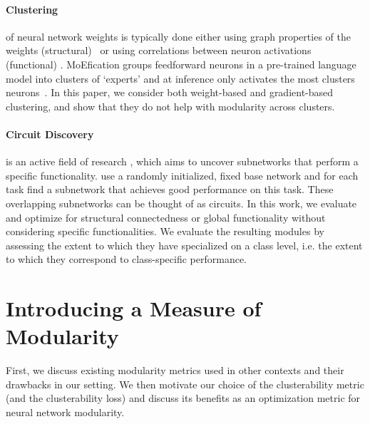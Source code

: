 \paragraph{Clustering} of neural network weights is typically done either using graph properties of the weights (structural)~\citep{watanabe2018modular, filan2021clusterability, patil2023neural} or using correlations between neuron activations (functional) \citep{hod2022detecting, lange2022clustering}.
MoEfication groups feedforward neurons in a pre-trained language model into clusters of `experts' and at inference only activates the most clusters neurons~\citep{zhang2022moefication}. In this paper, we consider both weight-based and gradient-based clustering, and show that they do not help with modularity across clusters.

\paragraph{Circuit Discovery} is an active field of research \citep{wang2022interpretability, olah2020zoom, elhage2021mathematical, conmy2023towards}, which aims to uncover subnetworks that perform a specific functionality. 
\citet{wortsman2020supermasks} use a randomly initialized, fixed base network and for each task find a subnetwork that achieves good performance on this task. 
These overlapping subnetworks can be thought of as circuits.
In this work, we evaluate and optimize for structural connectedness or global functionality without considering specific functionalities.
We evaluate the resulting modules by assessing the extent to which they have specialized on a class level, i.e. the extent to which they correspond to class-specific performance.

\section{Introducing a Measure of Modularity}
\label{sec:clusterability}

First, we discuss existing modularity metrics used in other contexts and their drawbacks in our setting. We then motivate our choice of the clusterability metric (and the clusterability loss) and discuss its benefits as an optimization metric for neural network modularity.

